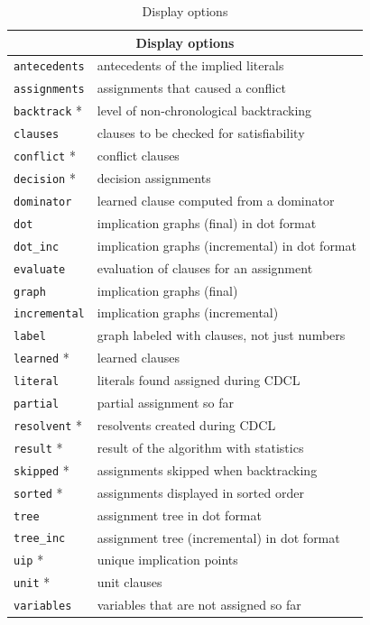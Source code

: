 \documentclass[11pt]{report}
\newcommand*{\p}[1]{\textup{\texttt{#1}}}
\begin{document}
\begin{table}[tbp]
\begin{center}
\begin{tabular}{|l|l|}
\hline
\multicolumn{2}{|c|}{\textbf{\large Display options}}\\
\hline
\p{antecedents}&  antecedents of the implied literals\\
\p{assignments}& assignments that caused a conflict         \\
\p{backtrack} *&  level of non-chronological backtracking    \\
\p{clauses}   &  clauses to be checked for satisfiability   \\
\p{conflict} * &  conflict clauses                           \\
\p{decision} * &  decision assignments                       \\
\p{dominator} &  learned clause computed from a dominator   \\
\p{dot}       &  implication graphs (final) in dot format           \\
\p{dot\_inc}  &  implication graphs (incremental) in dot format\\
\p{evaluate}  &  evaluation of clauses for an assignment    \\
\p{graph}     &  implication graphs (final)                 \\
\p{incremental}& implication graphs (incremental)           \\
\p{label}     &  graph labeled with clauses, not just numbers\\
\p{learned} *  &  learned clauses                            \\
\p{literal}   &  literals found assigned during CDCL        \\
\p{partial}   &  partial assignment so far                  \\
\p{resolvent} * &  resolvents created during CDCL             \\
\p{result} *   &  result of the algorithm with statistics    \\
\p{skipped} *  &  assignments skipped when backtracking      \\
\p{sorted} *   & assignments displayed in sorted order\\
\p{tree}       &  assignment tree in dot format\\
\p{tree\_inc}  &  assignment tree (incremental) in dot format\\
\p{uip} *       &  unique implication points                  \\
\p{unit} *     &  unit clauses                               \\
\p{variables} &  variables that are not assigned so far     \\
\hline
\end{tabular}
\end{center}
\caption{Display options}\label{tab.display}
\end{table}
\end{document}
